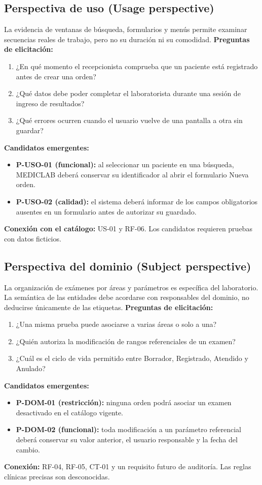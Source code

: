\subsection{Perspectiva de uso (Usage perspective)}
La evidencia de ventanas de búsqueda, formularios y menús permite examinar secuencias reales de trabajo, pero no su duración ni su comodidad.
\textbf{Preguntas de elicitación:}
\begin{enumerate}[label=\alph*)]
\item ¿En qué momento el recepcionista comprueba que un paciente está registrado antes de crear una orden?
\item ¿Qué datos debe poder completar el laboratorista durante una sesión de ingreso de resultados?
\item ¿Qué errores ocurren cuando el usuario vuelve de una pantalla a otra sin guardar?
\end{enumerate}
\textbf{Candidatos emergentes:}
\begin{itemize}
\item \textbf{P-USO-01 (funcional):} al seleccionar un paciente en una búsqueda, MEDICLAB deberá conservar su identificador al abrir el formulario Nueva orden.
\item \textbf{P-USO-02 (calidad):} el sistema deberá informar de los campos obligatorios ausentes en un formulario antes de autorizar su guardado.
\end{itemize}
\textbf{Conexión con el catálogo:} US-01 y RF-06. Los candidatos requieren pruebas con datos ficticios.

\subsection{Perspectiva del dominio (Subject perspective)}
La organización de exámenes por áreas y parámetros es específica del laboratorio. La semántica de las entidades debe acordarse con responsables del dominio, no deducirse únicamente de las etiquetas.
\textbf{Preguntas de elicitación:}
\begin{enumerate}[label=\alph*)]
\item ¿Una misma prueba puede asociarse a varias áreas o solo a una?
\item ¿Quién autoriza la modificación de rangos referenciales de un examen?
\item ¿Cuál es el ciclo de vida permitido entre Borrador, Registrado, Atendido y Anulado?
\end{enumerate}
\textbf{Candidatos emergentes:}
\begin{itemize}
\item \textbf{P-DOM-01 (restricción):} ninguna orden podrá asociar un examen desactivado en el catálogo vigente.
\item \textbf{P-DOM-02 (funcional):} toda modificación a un parámetro referencial deberá conservar su valor anterior, el usuario responsable y la fecha del cambio.
\end{itemize}
\textbf{Conexión:} RF-04, RF-05, CT-01 y un requisito futuro de auditoría. Las reglas clínicas precisas son desconocidas.

